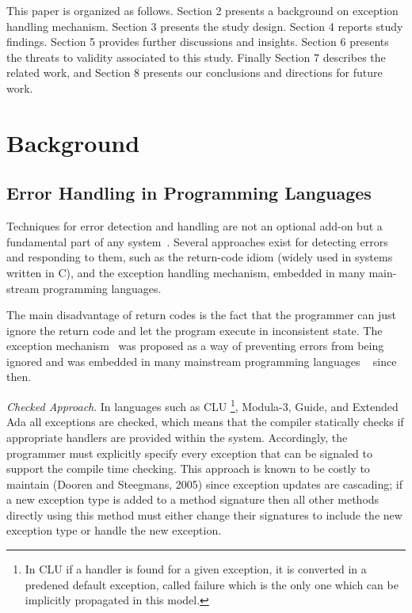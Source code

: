 \documentclass[conference]{IEEEtran}
\begin{document}
This paper is organized as follows. Section 2 presents a
background on exception handling mechanism. Section 3 presents the study design.
Section 4 reports study findings. Section 5 provides further discussions and insights.
Section 6 presents the threats to validity associated to this study. Finally Section
7 describes the related work, and Section 8 presents our conclusions and
directions for future work.


\section{Background}

\subsection{Error Handling in Programming Languages}

Techniques for error detection and handling are not  an optional add-on but a
fundamental part of any system~\cite{bruntink2006discovering}. Several
approaches exist for detecting errors and responding to them, such as the return-code 
idiom (widely used in systems written in C), and the exception handling 
mechanism, embedded in many main-stream programming languages.

The main disadvantage of return codes is the fact that the programmer can just
ignore the return code and let the program execute in inconsistent state. The
exception mechanism~\cite{goodenough1975exception} was proposed as a way of
preventing errors from being ignored and was embedded in many mainstream
programming languages ~\cite{garcia2001comparative} since then. 

\noindent\emph{Checked Approach}. In languages such as CLU \footnote{In 
CLU if a handler is found for a given exception, it is converted in a predened 
default exception, called failure which is the only one which can be implicitly 
propagated in this model.}, Modula-3, Guide, and Extended Ada all exceptions 
are checked, which means that the compiler
statically checks if appropriate handlers are provided within the system.
Accordingly, the programmer must explicitly specify every exception that can be
signaled to support the compile time checking. This approach is known to be
costly to maintain (Dooren and Steegmans, 2005) since exception updates are
cascading; if a new exception type is added to a method signature then all other
methods directly using this method must either change their signatures to
include the new exception type or handle the new exception.
\end{document}

